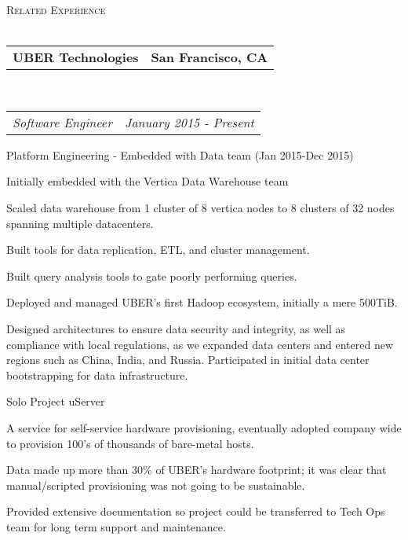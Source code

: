 \documentclass[10pt,letterpaper]{article}
\makeatletter
\newcommand{\lineunder}{\vspace*{-8pt} \\ \hspace*{-18pt} \hrulefill \\}
\newcommand{\header}[1]{{\hspace*{-15pt}\vspace*{6pt} \textsc{#1}} \vspace*{-6pt} \lineunder}
\newcommand{\headerrow}[2]
{\begin{tabular*}{\linewidth}{l@{\extracolsep{\fill}}r}
	#1 &
	#2 \\
\end{tabular*}}
\newcommand{\employment}[5]{
	\headerrow
		{\textbf{#1}}
		{\textbf{#2}}
	\\
	\headerrow
		{\emph{#3}}
		{\emph{#4}}
	\begin{itemize*}
		\item #5
	\end{itemize*}
}
\makeatother
\begin{document}
\header{Related Experience}
\employment{UBER Technologies}{San Francisco, CA}{Software Engineer}{January 2015 - Present}{
Platform Engineering - Embedded with Data team (Jan 2015-Dec 2015)
  \item Initially embedded with the Vertica Data Warehouse team
  \item Scaled data warehouse from 1 cluster of 8 vertica nodes to 8 clusters of 32 nodes spanning multiple datacenters.
  \item Built tools for data replication, ETL, and cluster management.
  \item Built query analysis tools to gate poorly performing queries.
  \item Deployed and managed UBER’s first Hadoop ecosystem, initially a mere 500TiB.
  \item Designed architectures to ensure data security and integrity, as well as compliance with local regulations, as we expanded data centers and entered new regions such as China, India, and Russia. Participated in initial data center bootstrapping for data infrastructure.
\item [Solo Project] uServer
  \item A service for self-service hardware provisioning, eventually adopted company wide to provision 100’s of thousands of bare-metal hosts.
  \item Data made up more than 30\% of UBER’s hardware footprint; it was clear that manual/scripted provisioning was not going to be sustainable.
  \item Provided extensive documentation so project could be transferred to Tech Ops team for long term support and maintenance.

}
\end{document}
